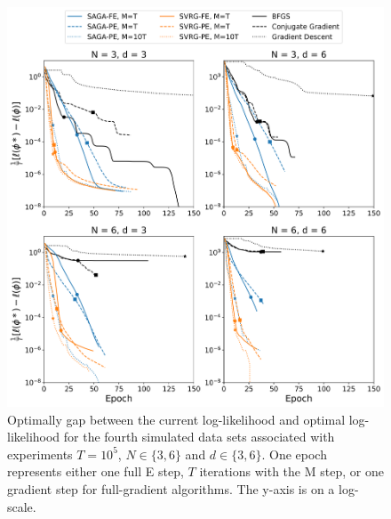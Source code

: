 \documentclass[12pt]{article}
\begin{document}
\begin{figure}[H]
    \centering
    \includegraphics[width=6.5in]{../plt/log-like_v_epoch_T-100000-003.png}
    \caption{Optimally gap between the current log-likelihood and optimal log-likelihood for the fourth simulated data sets associated with experiments $T=10^{5}$, $N \in \{3,6\}$ and $d \in \{3,6\}$. One epoch represents either one full E step, $T$ iterations with the M step, or one gradient step for full-gradient algorithms. The y-axis is on a log-scale.}
\end{figure}
%
\end{document}
